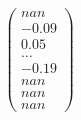 \documentclass[preview]{standalone}
\begin{document}
\begin{align*}
\begin{pmatrix} nan \\ -0.09 \\ 0.05 \\ \dots \\ -0.19 \\ nan \\ nan \\ nan \end{pmatrix}
\end{align*}
\end{document}
